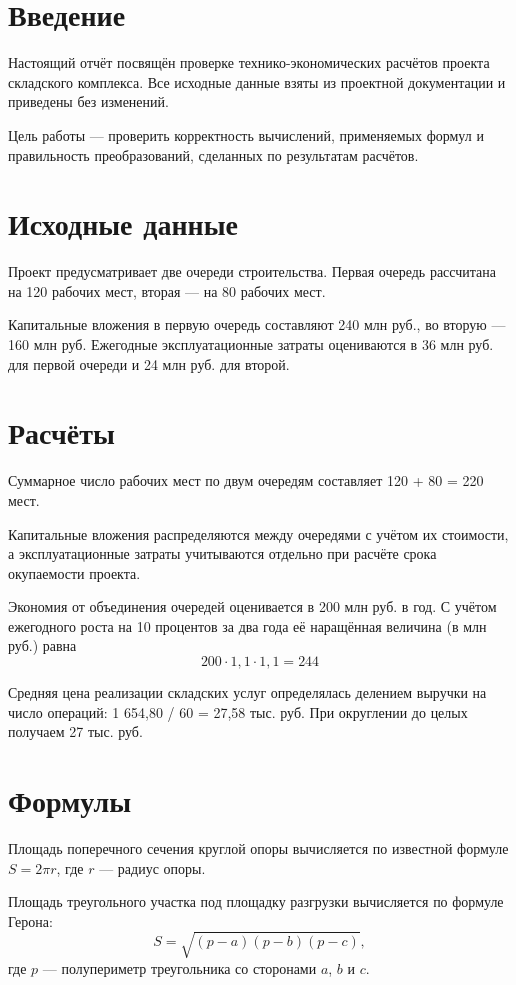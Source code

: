 \chapter{Введение}

Настоящий отчёт посвящён проверке технико-экономических расчётов
проекта складского комплекса. Все исходные данные взяты из проектной
документации и приведены без изменений.

Цель работы — проверить корректность вычислений, применяемых формул
и правильность преобразований, сделанных по результатам расчётов.
\chapter{Исходные данные}

Проект предусматривает две очереди строительства. Первая очередь
рассчитана на 120 рабочих мест, вторая — на 80 рабочих мест.

Капитальные вложения в первую очередь составляют 240 млн руб.,
во вторую — 160 млн руб. Ежегодные эксплуатационные затраты
оцениваются в 36 млн руб. для первой очереди и 24 млн руб.
для второй.
\chapter{Расчёты}

Суммарное число рабочих мест по двум очередям составляет
120 + 80 = 220 мест.

Капитальные вложения распределяются между очередями с учётом
их стоимости, а эксплуатационные затраты учитываются отдельно
при расчёте срока окупаемости проекта.

Экономия от объединения очередей оценивается в 200 млн руб. в год.
С учётом ежегодного роста на 10 процентов за два года её
наращённая величина (в млн руб.) равна
\[ 200 \cdot 1{,}1 \cdot 1{,}1 = 244 \]

Средняя цена реализации складских услуг определялась делением
выручки на число операций: 1 654,80 / 60 = 27,58 тыс. руб.
При округлении до целых получаем 27 тыс. руб.
\chapter{Формулы}

Площадь поперечного сечения круглой опоры вычисляется по известной
формуле $S = 2\pi r$, где $r$ — радиус опоры.

Площадь треугольного участка под площадку разгрузки вычисляется
по формуле Герона:
\[ S = \sqrt{(p - a)(p - b)(p - c)}, \]
где $p$ — полупериметр треугольника со сторонами $a$, $b$ и $c$.

